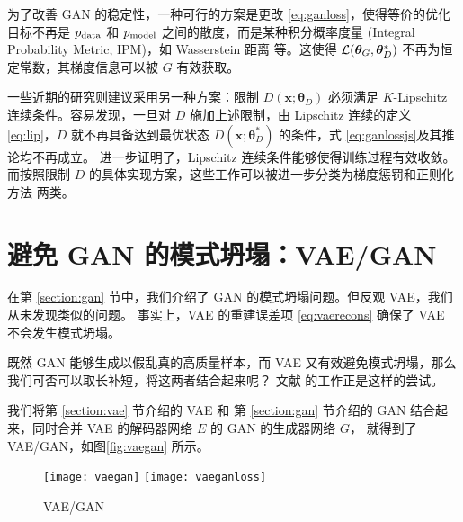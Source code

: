为了改善 GAN 的稳定性，一种可行的方案是更改 \eqref{eq:ganloss}，使得等价的优化目标不再是 $p_{\mathrm {data}}$ 和 $p_{\mathrm {model}}$ 之间的散度，而是某种积分概率度量 (Integral Probability Metric, IPM)，如 Wasserstein 距离\cite{wgan, wgangp} 等。这使得 $\mathcal{L}(\bm\theta_G, \bm\theta_D^*)$ 不再为恒定常数，其梯度信息可以被 $G$ 有效获取。


一些近期的研究\cite{ganestimation, lsgan2}则建议采用另一种方案：限制 $D(\bm x; \bm\theta_D)$ 必须满足 $K$-Lipschitz 连续条件。容易发现，一旦对 $D$ 施加上述限制，由 Lipschitz 连续的定义 \eqref{eq:lip}，$D$ 就不再具备达到最优状态 $D(\bm x; \bm\theta_D^*)$ 的条件，式 \eqref{eq:ganlossjs}及其推论均不再成立。
 进一步证明了，Lipschitz 连续条件能够使得训练过程有效收敛。
而按照限制 $D$ 的具体实现方案，这些工作可以被进一步分类为梯度惩罚\cite{wgangp, lsgan2, dragan}和正则化方法\cite{wgan, orthogan, sngan} 两类。





\section{避免 GAN 的模式坍塌：VAE/GAN \label{section:vaegan}}
在第 \ref{section:gan} 节中，我们介绍了 GAN 的模式坍塌问题。但反观 VAE，我们从未发现类似的问题。
事实上，VAE 的重建误差项 \eqref{eq:vaerecons} 确保了 VAE 不会发生模式坍塌。

既然 GAN 能够生成以假乱真的高质量样本，而 VAE 又有效避免模式坍塌，那么我们可否可以取长补短，将这两者结合起来呢？
文献  的工作正是这样的尝试。

我们将第 \ref{section:vae} 节介绍的 VAE 和
第 \ref{section:gan} 节介绍的 GAN 结合起来，同时合并 VAE 的解码器网络 $E$ 的 GAN 的生成器网络 $G$，
就得到了 VAE/GAN，如图\ref{fig:vaegan} 所示。
\begin{figure}[h]
	\centering%
	{\texttt{[image: vaegan]}}%
	\hspace{2em}%
	{\texttt{[image: vaeganloss]}}
	\caption{VAE/GAN\cite{vaegan}}
\end{figure}


